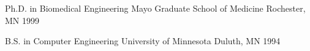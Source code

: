 

\begin{cventries}

  \cventry
    {Ph.D. in Biomedical Engineering} %
    {Mayo Graduate School of Medicine} %
    {Rochester, MN} %
    {1999} %
    {
    }

  \cventry
    {B.S. in Computer Engineering} %
    {University of Minnesota} %
    {Duluth, MN} %
    {1994} %
    {
    }
\end{cventries}
